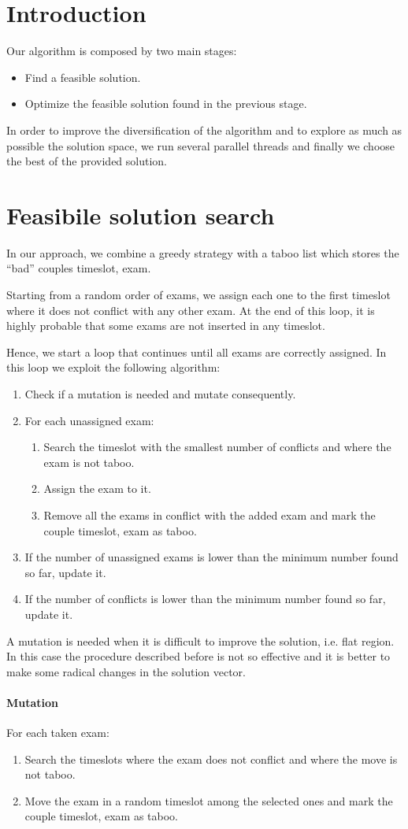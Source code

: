 \section*{Introduction}
Our algorithm is composed by two main stages:
\begin{itemize}
\item Find a feasible solution.
\item Optimize the feasible solution found in the previous stage.
\end{itemize}

In order to improve the diversification of the algorithm and to explore as much as possible the solution space, we run several parallel threads and finally we choose the best of the provided solution.

\section*{Feasibile solution search}
In our approach, we combine a greedy strategy with a taboo list which stores the ``bad'' couples timeslot, exam.

Starting from a random order of exams, we assign each one to the first timeslot where it does not conflict with any other exam. At the end of this loop, it is highly probable that some exams are not inserted in any timeslot.

Hence, we start a loop that continues until all exams are correctly assigned. In this loop we exploit the following algorithm:
\begin{enumerate}
\item Check if a mutation is needed and mutate consequently.
\item For each unassigned exam:
\begin{enumerate}
\item Search the timeslot with the smallest number of conflicts and where the exam is not taboo.
\item Assign the exam to it.
\item Remove all the exams in conflict with the added exam and mark the couple timeslot, exam as taboo.
\end{enumerate} 
\item If the number of unassigned exams is lower than the minimum number found so far, update it.
\item If the number of conflicts is lower than the minimum number found so far, update it.
\end{enumerate}
A mutation is needed when it is difficult to improve the solution, i.e. flat region. In this case the procedure described before is not so effective and it is better to make some radical changes in the solution vector.
\paragraph*{Mutation}
For each taken exam:
\begin{enumerate}
\item Search the timeslots where the exam does not conflict and where the move is not taboo.
\item Move the exam in a random timeslot among the selected ones and mark the couple timeslot, exam as taboo.
\end{enumerate}